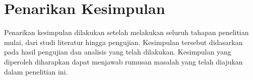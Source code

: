 \section{Penarikan Kesimpulan}
\label{subsec: metodologi-penarikan-kesimpulan}
Penarikan kesimpulan dilakukan setelah melakukan seluruh tahapan penelitian mulai, dari studi literatur hingga pengujian.
Kesimpulan tersebut didasarkan pada hasil pengujian dan analisis yang telah dilakukan.
Kesimpulan yang diperoleh diharapkan dapat menjawab rumusan masalah yang telah diajukan dalam penelitian ini.

%

%

